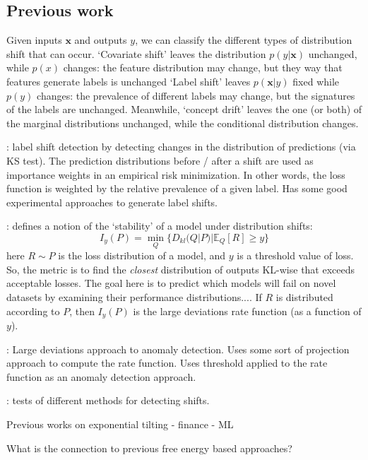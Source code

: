 \documentclass[10pt, twocolumn]{article}      %
\begin{document}
\subsection{Previous work}

Given inputs $\bm{x}$ and outputs $y$, we can classify the different types of distribution shift that can occur.
`Covariate shift' leaves the distribution $p(y|\bm{x})$ unchanged, while $p(x)$ changes: the feature distribution may change, but they way that features generate labels is unchanged
`Label shift' leaves $p(\bm{x}|y)$ fixed while $p(y)$ changes: the prevalence of different labels may change, but the signatures of the labels are unchanged.
Meanwhile, `concept drift' leaves the one (or both) of the marginal distributions unchanged, while the conditional distribution changes.

\cite{lipton_detecting_2018}: label shift detection by detecting changes in the distribution of predictions (via KS test).
The prediction distributions before / after a shift are used as importance weights in an empirical risk minimization.
In other words, the loss function is weighted by the relative prevalence of a given label.
Has some good experimental approaches to generate label shifts.


\cite{namkoong_minimax_2024}: defines a notion of the `stability' of a model under distribution shifts:
\begin{equation}
  I_y(P) = \min_Q \{D_{kl}(Q | P) | \mathbb{E}_Q[R] \ge y  \}
\end{equation}
here $R \sim P$ is the loss distribution of a model, and $y$ is a threshold value of loss.
So, the metric is to find the \textit{closest} distribution of outputs KL-wise that exceeds acceptable losses.
The goal here is to predict which models will fail on novel datasets by examining their performance distributions....
If $R$ is distributed according to $P$, then $I_y(P)$ is the large deviations rate function (as a function of $y$).

\cite{guggilam_anomaly_2021}: Large deviations approach to anomaly detection. Uses some sort of projection approach to compute the rate function. Uses threshold applied to the rate function as an anomaly detection approach.

\cite{rabanser_failing_2019}: tests of different methods for detecting shifts.



Previous works on exponential tilting
- finance
- ML

What is the connection to previous free energy based approaches?
\end{document}
